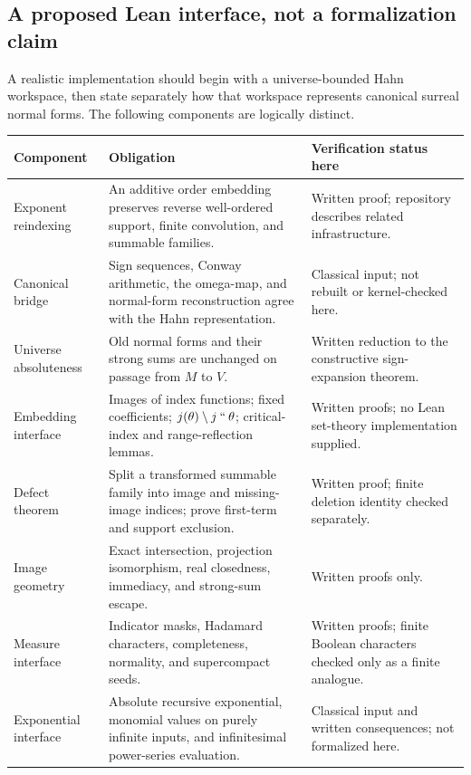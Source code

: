 \documentclass[11pt,letterpaper]{article}
\numberwithin{equation}{section}
\theoremstyle{definition}
\theoremstyle{remark}
\newcommand{\imset}[2]{#1\mathbin{``}#2}
\begin{document}
\subsection{A proposed Lean interface, not a formalization claim}
A realistic implementation should begin with a universe-bounded Hahn
workspace, then state separately how that workspace represents canonical
surreal normal forms. The following components are logically distinct.

\begin{longtable}{@{}p{}p{}p{}@{}}
\toprule
\textbf{Component} & \textbf{Obligation} & \textbf{Verification status here}\\
\midrule\endhead
Exponent reindexing & An additive order embedding preserves reverse
well-ordered support, finite convolution, and summable families. & Written
proof; repository describes related infrastructure.\\[5pt]
Canonical bridge & Sign sequences, Conway arithmetic, the omega-map, and
normal-form reconstruction agree with the Hahn representation. & Classical
input; not rebuilt or kernel-checked here.\\[5pt]
Universe absoluteness & Old normal forms and their strong sums are unchanged
on passage from $M$ to $V$. & Written reduction to the constructive
sign-expansion theorem.\\[5pt]
Embedding interface & Images of index functions; fixed coefficients;
$j(\theta)\setminus\imset j\theta$; critical-index and range-reflection
lemmas. & Written proofs; no Lean set-theory implementation supplied.\\[5pt]
Defect theorem & Split a transformed summable family into image and
missing-image indices; prove first-term and support exclusion. & Written
proof; finite deletion identity checked separately.\\[5pt]
Image geometry & Exact intersection, projection isomorphism, real closedness,
immediacy, and strong-sum escape. & Written proofs only.\\[5pt]
Measure interface & Indicator masks, Hadamard characters, completeness,
normality, and supercompact seeds. & Written proofs; finite Boolean
characters checked only as a finite analogue.\\[5pt]
Exponential interface & Absolute recursive exponential, monomial values on
purely infinite inputs, and infinitesimal power-series evaluation. &
Classical input and written consequences; not formalized here.\\
\bottomrule
\end{longtable}
\end{document}
